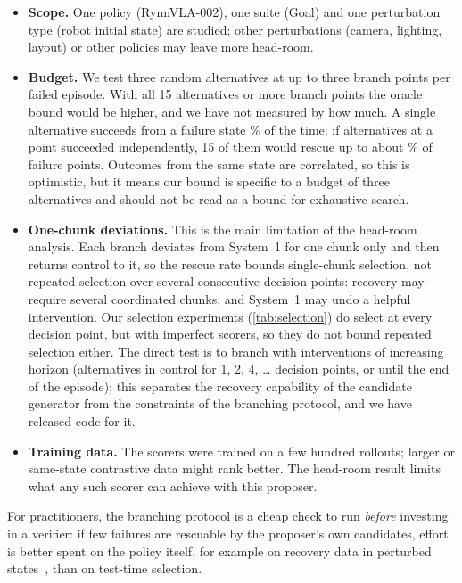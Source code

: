 \documentclass{article}
\begin{document}
\begin{itemize}[leftmargin=*,itemsep=2pt]
  \item \textbf{Scope.} One policy (RynnVLA-002), one suite (Goal) and one perturbation type (robot initial state) are studied; other perturbations (camera, lighting, layout) or other policies may leave more head-room.
  \item \textbf{Budget.} We test three random alternatives at up to three branch points per failed episode. With all 15 alternatives or more branch points the oracle bound would be higher, and we have not measured by how much. A single alternative succeeds from a failure state \altFail\% of the time; if alternatives at a point succeeded independently, 15 of them would rescue up to about \altIndepFifteen\% of failure points. Outcomes from the same state are correlated, so this is optimistic, but it means our bound is specific to a budget of three alternatives and should not be read as a bound for exhaustive search.
  \item \textbf{One-chunk deviations.} This is the main limitation of the head-room analysis. Each branch deviates from System~1 for one chunk only and then returns control to it, so the rescue rate bounds single-chunk selection, not repeated selection over several consecutive decision points: recovery may require several coordinated chunks, and System~1 may undo a helpful intervention. Our selection experiments (\cref{tab:selection}) do select at every decision point, but with imperfect scorers, so they do not bound repeated selection either. The direct test is to branch with interventions of increasing horizon (alternatives in control for 1, 2, 4, \ldots{} decision points, or until the end of the episode); this separates the recovery capability of the candidate generator from the constraints of the branching protocol, and we have released code for it.
  \item \textbf{Training data.} The scorers were trained on a few hundred rollouts; larger or same-state contrastive data might rank better. The head-room result limits what any such scorer can achieve with this proposer.
\end{itemize}

\noindent For practitioners, the branching protocol is a cheap check to run \emph{before} investing in a verifier: if few failures are rescuable by the proposer's own candidates, effort is better spent on the policy itself, for example on recovery data in perturbed states~\citep{ross2011dagger}, than on test-time selection.
\end{document}
